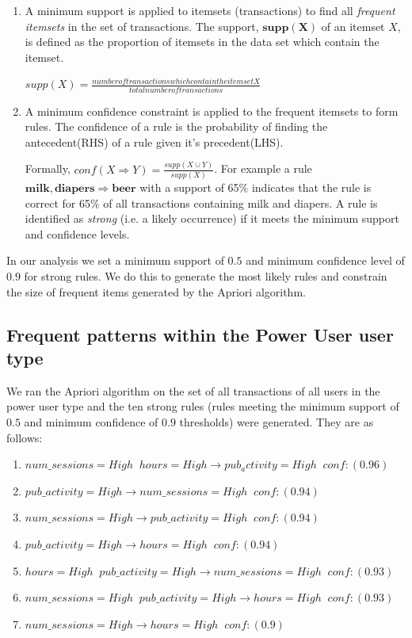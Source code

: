\documentclass{acm_proc_article-sp}
\begin{document}
\begin{enumerate}
\item A minimum support is applied to itemsets (transactions) to find all \textit{frequent itemsets} in the set of transactions.
The support, $\mathbf{supp(X)}$ of an itemset $X$, is defined as the proportion of itemsets in the data set which contain the 
itemset.



$supp\left(X\right) = \frac{number of transactions which contain the itemset X}{total number of transactions}$



\item A minimum confidence constraint is applied to the frequent itemsets to form rules. The confidence of a rule is the probability of finding the antecedent(RHS) of a rule given it's precedent(LHS).

Formally, $conf(X \Longrightarrow Y) = \frac{supp\left(X \cup Y\right)}{supp\left(X\right)}$. 
For example a rule $\mathbf{milk,diapers \Longrightarrow {beer}}$ with a support of 65\% indicates that the rule is correct for 65\% of all transactions containing milk and diapers.
 A rule is identified as \textit{strong} (i.e. a likely occurrence) if it meets the minimum support and confidence levels.
\end{enumerate}

In our analysis we set a minimum support of $0.5$ and minimum confidence level of $0.9$ for strong rules. We do this to generate the most likely rules and constrain the size of frequent items generated by the Apriori algorithm.

\subsection {Frequent patterns within the Power User user type}
We ran the Apriori algorithm on the set of all transactions of all users in the power user type and the ten strong rules (rules meeting the minimum support of $0.5$ and minimum confidence of $0.9$ thresholds) were generated. They are as follows:

\begin{enumerate}
 \item $num\_sessions=High \;\; hours=High \longrightarrow pub_activity=High   \;\;conf:(0.96)$
 \item $pub\_activity=High \longrightarrow num\_sessions=High  \;\;  conf:(0.94)$
 \item $num\_sessions=High \longrightarrow pub\_activity=High   \;\; conf:(0.94)$
 \item $pub\_activity=High \longrightarrow hours=High  \;\;  conf:(0.94)$
 \item $hours=High \;\; pub\_activity=High \longrightarrow num\_sessions=High  \;\; conf:(0.93)$
 \item $num\_sessions=High \;\; pub\_activity=High \longrightarrow hours=High   \;\;conf:(0.93)$
 \item $num\_sessions=High  \longrightarrow hours=High \;\;  conf:(0.9)$
\end{enumerate}
\end{document}
